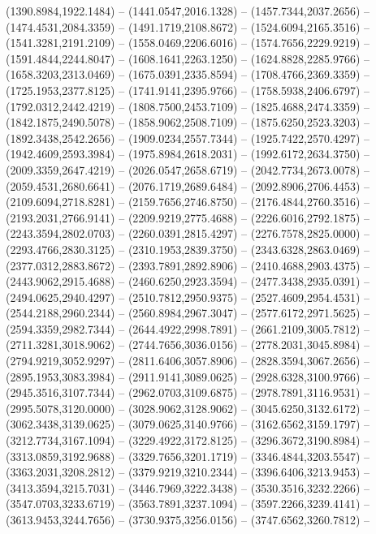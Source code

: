 \begin{scope}[y=0.80pt, x=0.80pt, yscale=-1.000000, xscale=1.000000, inner sep=0pt, outer sep=0pt]
    (1390.8984,1922.1484) -- (1441.0547,2016.1328) -- (1457.7344,2037.2656) --
    (1474.4531,2084.3359) -- (1491.1719,2108.8672) -- (1524.6094,2165.3516) --
    (1541.3281,2191.2109) -- (1558.0469,2206.6016) -- (1574.7656,2229.9219) --
    (1591.4844,2244.8047) -- (1608.1641,2263.1250) -- (1624.8828,2285.9766) --
    (1658.3203,2313.0469) -- (1675.0391,2335.8594) -- (1708.4766,2369.3359) --
    (1725.1953,2377.8125) -- (1741.9141,2395.9766) -- (1758.5938,2406.6797) --
    (1792.0312,2442.4219) -- (1808.7500,2453.7109) -- (1825.4688,2474.3359) --
    (1842.1875,2490.5078) -- (1858.9062,2508.7109) -- (1875.6250,2523.3203) --
    (1892.3438,2542.2656) -- (1909.0234,2557.7344) -- (1925.7422,2570.4297) --
    (1942.4609,2593.3984) -- (1975.8984,2618.2031) -- (1992.6172,2634.3750) --
    (2009.3359,2647.4219) -- (2026.0547,2658.6719) -- (2042.7734,2673.0078) --
    (2059.4531,2680.6641) -- (2076.1719,2689.6484) -- (2092.8906,2706.4453) --
    (2109.6094,2718.8281) -- (2159.7656,2746.8750) -- (2176.4844,2760.3516) --
    (2193.2031,2766.9141) -- (2209.9219,2775.4688) -- (2226.6016,2792.1875) --
    (2243.3594,2802.0703) -- (2260.0391,2815.4297) -- (2276.7578,2825.0000) --
    (2293.4766,2830.3125) -- (2310.1953,2839.3750) -- (2343.6328,2863.0469) --
    (2377.0312,2883.8672) -- (2393.7891,2892.8906) -- (2410.4688,2903.4375) --
    (2443.9062,2915.4688) -- (2460.6250,2923.3594) -- (2477.3438,2935.0391) --
    (2494.0625,2940.4297) -- (2510.7812,2950.9375) -- (2527.4609,2954.4531) --
    (2544.2188,2960.2344) -- (2560.8984,2967.3047) -- (2577.6172,2971.5625) --
    (2594.3359,2982.7344) -- (2644.4922,2998.7891) -- (2661.2109,3005.7812) --
    (2711.3281,3018.9062) -- (2744.7656,3036.0156) -- (2778.2031,3045.8984) --
    (2794.9219,3052.9297) -- (2811.6406,3057.8906) -- (2828.3594,3067.2656) --
    (2895.1953,3083.3984) -- (2911.9141,3089.0625) -- (2928.6328,3100.9766) --
    (2945.3516,3107.7344) -- (2962.0703,3109.6875) -- (2978.7891,3116.9531) --
    (2995.5078,3120.0000) -- (3028.9062,3128.9062) -- (3045.6250,3132.6172) --
    (3062.3438,3139.0625) -- (3079.0625,3140.9766) -- (3162.6562,3159.1797) --
    (3212.7734,3167.1094) -- (3229.4922,3172.8125) -- (3296.3672,3190.8984) --
    (3313.0859,3192.9688) -- (3329.7656,3201.1719) -- (3346.4844,3203.5547) --
    (3363.2031,3208.2812) -- (3379.9219,3210.2344) -- (3396.6406,3213.9453) --
    (3413.3594,3215.7031) -- (3446.7969,3222.3438) -- (3530.3516,3232.2266) --
    (3547.0703,3233.6719) -- (3563.7891,3237.1094) -- (3597.2266,3239.4141) --
    (3613.9453,3244.7656) -- (3730.9375,3256.0156) -- (3747.6562,3260.7812) --

\end{scope}
